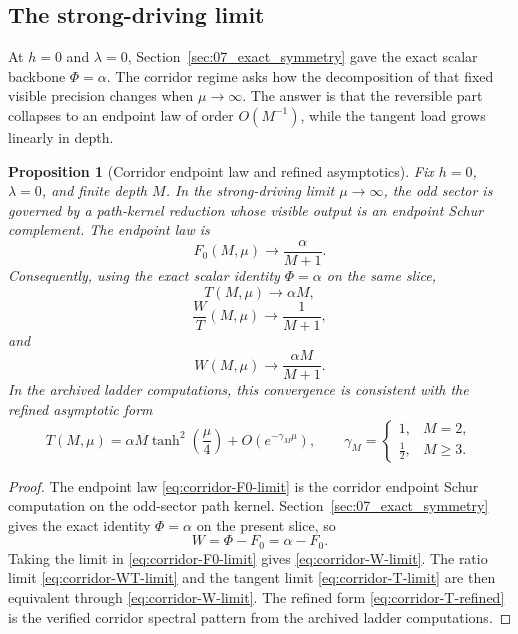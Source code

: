 \documentclass[11pt]{article}
\numberwithin{equation}{section}
\theoremstyle{thmcompact}
\newtheorem{proposition}[theorem]{Proposition}
\theoremstyle{remark}
\begin{document}
\subsection{The strong-driving limit}
\label{subsec:strong-driving-limit}

At $h=0$ and $\lambda=0$, Section~\ref{sec:07_exact_symmetry} gave the exact scalar backbone $\Phi=\alpha$. The corridor regime asks how the decomposition of that fixed visible precision changes when $\mu\to\infty$. The answer is that the reversible part collapses to an endpoint law of order $O(M^{-1})$, while the tangent load grows linearly in depth.

\begin{proposition}[Corridor endpoint law and refined asymptotics]\label{thm:corridor-path-kernel}
Fix $h=0$, $\lambda=0$, and finite depth $M$. In the strong-driving limit $\mu\to\infty$, the odd sector is governed by a path-kernel reduction whose visible output is an endpoint Schur complement. The endpoint law is
\begin{equation}\label{eq:corridor-F0-limit}
F_0(M,\mu)\to \frac{\alpha}{M+1}.
\end{equation}
Consequently, using the exact scalar identity $\Phi=\alpha$ on the same slice,
\begin{equation}\label{eq:corridor-T-limit}
T(M,\mu)\to \alpha M,
\end{equation}
\begin{equation}\label{eq:corridor-WT-limit}
\frac{W}{T}(M,\mu)\to \frac{1}{M+1},
\end{equation}
and
\begin{equation}\label{eq:corridor-W-limit}
W(M,\mu)\to \frac{\alpha M}{M+1}.
\end{equation}
In the archived ladder computations, this convergence is consistent with the refined asymptotic form
\begin{equation}\label{eq:corridor-T-refined}
T(M,\mu)=\alpha M\tanh^2\!\left(\frac{\mu}{4}\right)+O\!\left(e^{-\gamma_M\mu}\right),
\qquad
\gamma_M=
\begin{cases}
1, & M=2,\\
\tfrac12, & M\ge 3.
\end{cases}
\end{equation}
\end{proposition}

\begin{proof}
The endpoint law \eqref{eq:corridor-F0-limit} is the corridor endpoint Schur computation on the odd-sector path kernel. Section~\ref{sec:07_exact_symmetry} gives the exact identity $\Phi=\alpha$ on the present slice, so
\[
W=\Phi-F_0=\alpha-F_0.
\]
Taking the limit in \eqref{eq:corridor-F0-limit} gives \eqref{eq:corridor-W-limit}. The ratio limit \eqref{eq:corridor-WT-limit} and the tangent limit \eqref{eq:corridor-T-limit} are then equivalent through \eqref{eq:corridor-W-limit}. The refined form \eqref{eq:corridor-T-refined} is the verified corridor spectral pattern from the archived ladder computations.
\end{proof}
\end{document}

